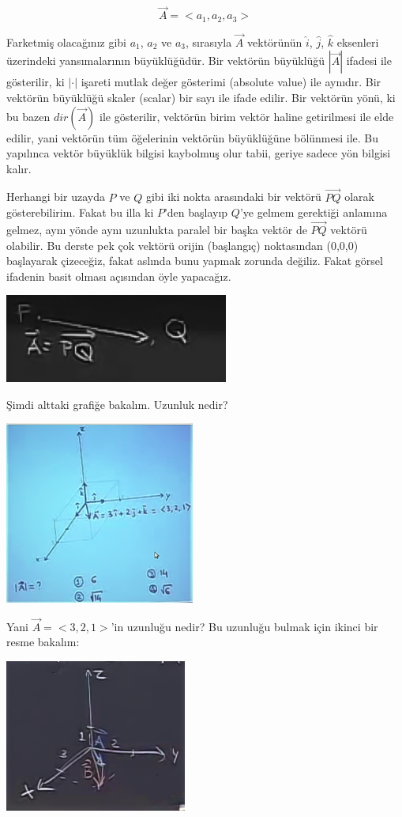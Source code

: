 \documentclass[12pt,fleqn]{article}\usepackage{../../common}
\begin{document}
$$
\vec{A} = < a_1, a_2, a_3 >
$$

Farketmiş olacağınız gibi $a_1$, $a_2$ ve $a_3$, sırasıyla $\vec{A}$
vektörünün $\hat{i}$, $\hat{j}$, $\hat{k}$ eksenleri üzerindeki yansımalarının
büyüklüğüdür. Bir vektörün büyüklüğü $|\vec{A}|$ ifadesi ile gösterilir, ki
$|\cdot|$ işareti mutlak değer gösterimi (absolute value) ile aynıdır. Bir
vektörün büyüklüğü skaler (scalar) bir sayı ile ifade edilir. Bir vektörün yönü,
ki bu bazen $dir(\vec{A})$ ile gösterilir, vektörün birim vektör haline
getirilmesi ile elde edilir, yani vektörün tüm öğelerinin vektörün büyüklüğüne
bölünmesi ile. Bu yapılınca vektör büyüklük bilgisi kaybolmuş olur tabii, geriye
sadece yön bilgisi kalır.

Herhangi bir uzayda $P$ ve $Q$ gibi iki nokta arasındaki bir vektörü $\vec{PQ}$
olarak gösterebilirim. Fakat bu illa ki $P$'den başlayıp $Q$'ye gelmem gerektiği
anlamına gelmez, aynı yönde aynı uzunlukta paralel bir başka vektör de
$\vec{PQ}$ vektörü olabilir. Bu derste pek çok vektörü orijin (başlangıç)
noktasından (0,0,0) başlayarak çizeceğiz, fakat aslında bunu yapmak zorunda
değiliz. Fakat görsel ifadenin basit olması açısından öyle yapacağız.

\includegraphics[height=2.9cm]{1_2.png}

Şimdi alttaki grafiğe bakalım. Uzunluk nedir?

\includegraphics[height=6cm]{1_3.png}

Yani $\vec{A} = <3,2,1>$'in uzunluğu nedir?  Bu uzunluğu bulmak için ikinci bir
resme bakalım:

\includegraphics[height=5cm]{1_4.png}
\end{document}
